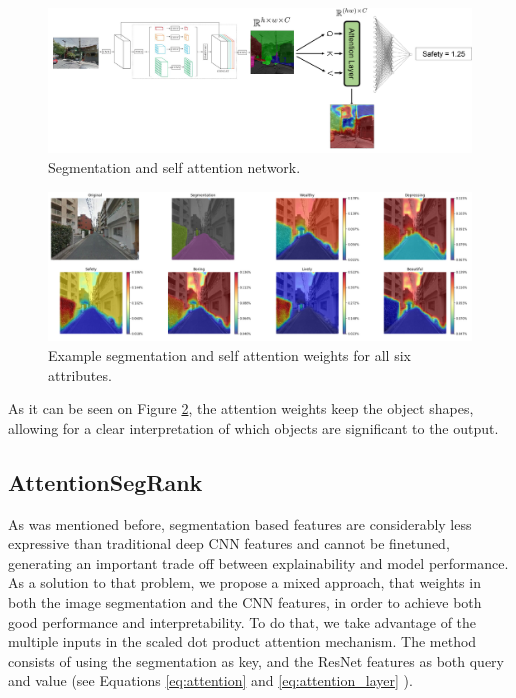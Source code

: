 \begin{figure}[ht]
	\begin{center}
	\includegraphics[width=1\textwidth]{./figures/self_attn.png}
	\caption[Self Attention network]{Segmentation and self attention network.}
	\label{fig:selfsegrank}
	\end{center}
\end{figure}

\begin{figure}[ht]
	\begin{center}
	\includegraphics[width=1\textwidth]{./figures/self_attn_vis.png}
	\caption[Self Attention Model output]{Example segmentation and self attention weights for all six attributes.}
	\label{fig:segrank_attention}
	\end{center}
\end{figure}

As it can be seen on Figure \ref{fig:segrank_attention}, the attention weights keep the object shapes,
allowing for a clear interpretation of which objects are significant to the output.

\subsection{AttentionSegRank}
As was mentioned before, segmentation based features are considerably less expressive than
traditional deep CNN features and cannot be finetuned, generating an important trade off between explainability and model performance.
As a solution to that problem, we propose a mixed approach, that weights in both the image segmentation
and the CNN features, in order to achieve both good performance and interpretability. To do that,
we take advantage of the multiple inputs in the scaled dot product attention mechanism. The method consists
of using the segmentation as key, and the ResNet features as both query and value (see Equations \ref{eq:attention} and \ref{eq:attention_layer} ).

